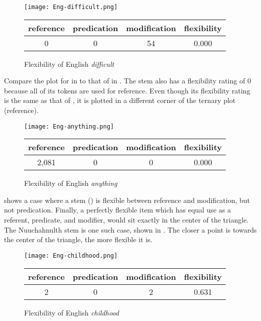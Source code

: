 \begin{figure}

  \centering
  \caption{Flexibility of English \textit{difficult}}
  \label{fig:Eng-difficult}

  \texttt{[image: Eng-difficult.png]}

  \begin{tabular}{ c c c c }
    \toprule
    reference & predication & modification & flexibility\\
    \midrule
    0         & 0           & 54           & 0.000      \\
    \bottomrule
  \end{tabular}

\end{figure}

Compare the plot for  in  to that of  in . The stem  also has a flexibility rating of $0$ because all of its tokens are used for reference. Even though its flexibility rating is the same as that of , it is plotted in a different corner of the ternary plot (reference).

\begin{figure}

  \centering
  \caption{Flexibility of English \textit{anything}}
  \label{fig:Eng-anything}

  \texttt{[image: Eng-anything.png]}

  \begin{tabular}{ c c c c }
    \toprule
    reference & predication & modification & flexibility\\
    \midrule
    2,081     & 0           & 0            & 0.000      \\
    \bottomrule
  \end{tabular}

\end{figure}

 shows a case where a stem () is flexible between reference and modification, but not predication. Finally, a perfectly flexible item which has equal use as a referent, predicate, and modifier, would sit exactly in the center of the triangle. The Nuuchahnulth stem   is one such case, shown in . The closer a point is towards the center of the triangle, the more flexible it is.

\begin{figure}

  \centering
  \caption{Flexibility of English \textit{childhood}}
  \label{fig:Eng-childhood}

  \texttt{[image: Eng-childhood.png]}

  \begin{tabular}{ c c c c }
    \toprule
    reference & predication & modification & flexibility\\
    \midrule
    2         & 0           & 2            & 0.631      \\
    \bottomrule
  \end{tabular}

\end{figure}

